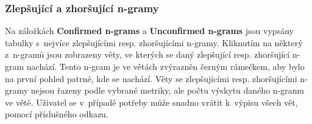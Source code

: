 \subsubsection{Zlepšující a zhoršující \mbox{n-gramy}}
Na záložkách \textbf{Confirmed \mbox{n-grams}} a \textbf{Unconfirmed \mbox{n-grams}} jsou vypsány tabulky s~nejvíce zlepšujícími resp. zhoršujícími \mbox{n-gramy}.
Kliknutím na některý z~\mbox{n-gramů} jsou zobrazeny věty,
  ve kterých se daný zlepšující resp. zhoršující \mbox{n-gram} nachází.
Tento \mbox{n-gram} je ve větách zvýrazněn černým rámečkem,
  aby bylo na první pohled patrné,
  kde se nachází.
Věty se zlepšujícími resp. zhoršujícími \mbox{n-gramy} nejsou řazeny podle vybrané metriky,
  ale počtu výskytu daného \mbox{n-gramu} ve větě.
Uživatel se v~případě potřeby může snadno vrátit k~výpisu všech vět, pomocí příslušného odkazu.



